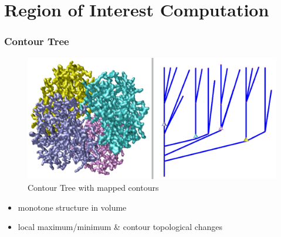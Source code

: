 \documentclass[8pt]{beamer}
\begin{document}

\section{Region of Interest Computation}

\begin{frame}
  \frametitle{Contour Tree}
  \begin{figure}[H]
    \centering
    \includegraphics[width=.8\textwidth]{images/contour_tree_hemoglobin.png}
    \caption{Contour Tree with mapped contours}
  \end{figure}
  \begin{itemize}
  \item {} monotone structure in volume
  \item {} local maximum/minimum \& contour topological changes
  \end{itemize}
\end{frame}
\note{}
\end{document}
